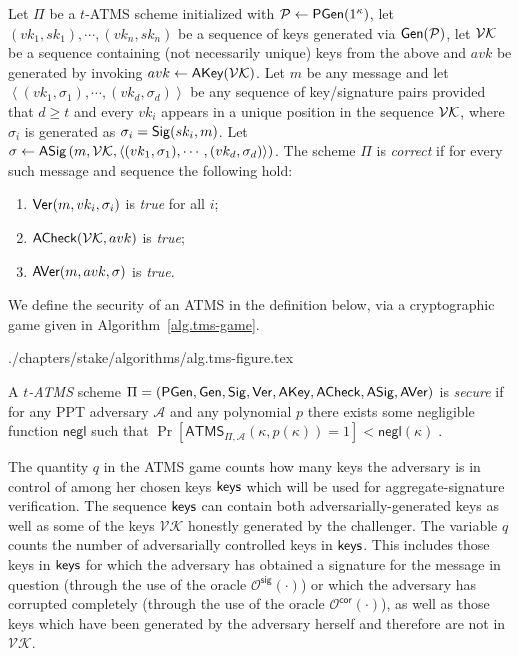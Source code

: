\begin{definition}
  \label{def:ATMS-correctness}
  Let $\Pi$ be a $t$-ATMS scheme
  initialized with $\mathcal{P} \gets \textsf{PGen}(1^\kappa)$, let
  $(vk_1, sk_1), \cdots, (vk_n, sk_n)$
  be a sequence of keys generated via $\mathsf{Gen}(\mathcal{P})$, let $\mathcal{VK}$ be a sequence
  containing (not necessarily unique) keys from the above and $avk$ be generated
  by invoking $avk \gets \textsf{AKey}(\mathcal{VK})$. Let $m$ be any message and let
  $\left<(vk_1, \sigma_1), \cdots, (vk_d, \sigma_d)\right>$ be any sequence of key/signature pairs provided
  that $d \geq t$ and every $vk_i$ appears in a unique position in the sequence
  $\mathcal{VK}$, where $\sigma_i$ is generated as $\sigma_i = \mathsf{Sig}(sk_i, m)$.
  Let
  $\sigma
  \gets
  \textsf{ASig}\left(
    m,
    \mathcal{VK},
    \left<(vk_1, \sigma_1), \cdots, (vk_d, \sigma_d)\right>
  \right)
  $.
  The scheme $\Pi$ is
  \emph{correct} if for every such message and sequence the following hold:
  \begin{enumerate}
    \item $\mathsf{Ver}(m, vk_i, \sigma_i)$ is \emph{true} for all $i$;
    \item $\textsf{ACheck}(\mathcal{VK}, avk)$ is \emph{true};
    \item $\textsf{AVer}(m, avk, \sigma)$ is \emph{true}.
  \end{enumerate}
\end{definition}

We define the security of an ATMS
in the definition below,
via a cryptographic game given in Algorithm~\ref{alg.tms-game}.

{./chapters/stake/algorithms/alg.tms-figure.tex}

\begin{definition}[Security]
  \label{def:ATMS-security}
  A \textit{$t$-ATMS} scheme
  $\Pi = (
    \textsf{PGen},\allowbreak
    \mathsf{Gen},\allowbreak
    \mathsf{Sig},\allowbreak
    \mathsf{Ver},\allowbreak
    \textsf{AKey},\allowbreak
    \textsf{ACheck},\allowbreak
    \textsf{ASig},\allowbreak
    \textsf{AVer}
  )$
  is \emph{secure} if for any PPT adversary $\mathcal{A}$ and any polynomial $p$
  there exists some negligible function $\textsf{negl}$ such that
  $
    \Pr[ \textsf{ATMS}_{\Pi, \mathcal{A}}(\kappa, p(\kappa)) = 1]
    < \textsf{negl}(\kappa)
    \; .
  $
\end{definition}

The quantity $q$ in the ATMS game counts how many keys the adversary is in
control of among her chosen keys $\textsf{keys}$ which will be used for
aggregate-signature verification. The sequence $\textsf{keys}$ can contain both
adversarially-generated keys as well as some of the keys $\mathcal{VK}$
honestly generated by the challenger. The variable $q$ counts the number of
adversarially controlled keys in $\textsf{keys}$. This includes those keys in
$\textsf{keys}$ for which the adversary has obtained a signature for the message in
question (through the use of the oracle $\mathcal{O}^\mathsf{sig}(\cdot)$) or which the
adversary has corrupted completely (through the use of the oracle
$\mathcal{O}^\mathsf{cor}(\cdot)$), as well as those keys which have been generated by
the adversary herself and therefore are not in $\mathcal{VK}$.

